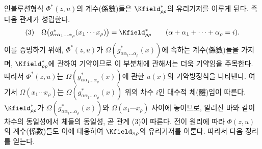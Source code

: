 
인볼루션형식 $\Phi^*(z,u)$의 계수(係數)들은 $\Kfield^*_{\rho\rho}$의 유리기저를 이루게 된다. 즉 다음 관계가 성립한다.
\[
\begin{array}{@{}l@{\quad}c@{}}
(3)& \Omega\bigl(g^*_{\alpha\alpha_1\ldots\alpha_\rho}(x_1\cdots x_\rho)\bigr)=\Kfield^*_{\rho\rho}\qquad(\alpha+\alpha_1+\cdots+\alpha_\rho=i).
\end{array}
\]
이를 증명하기 위해, $\Phi^*(z,u)$가 $\Omega(g^*_{\alpha\alpha_1\ldots\alpha_\rho}(x))$에 속하는 계수(係數)들을 가지며, $\Kfield^*_{\rho\rho}$에 관하여 기약이므로 이 부분체에 관해서는 더욱 기약임을 주목한다. 따라서 $\Phi^*(z,u)$는 $\Omega(g^*_{\alpha\alpha_1\ldots\alpha_\rho}(x))$에 관한 $u(x)$의 기약방정식을 나타낸다. 여기서 $\Omega(x_1\cdots x_\rho)$는 $\Omega(g^*_{\alpha\alpha_1\ldots\alpha_\rho}(x))$ 위의 차수 $i$인 대수적 체(體)임이 따른다. $\Kfield^*_{\rho\rho}$가 $\Omega(g^*_{\alpha\alpha_1\ldots\alpha_\rho}(x))$와 $\Omega(x_1\cdots x_\rho)$ 사이에 놓이므로, 알려진 바와 같이 차수의 동일성에서 체들의 동일성, 곧 관계 (3)이 따른다. 전이 원리에 따라 $\Phi(z,u)$의 계수(係數)들도 이에 대응하여 $\Kfield_{n\rho}$의 유리기저를 이룬다. 따라서 다음 정리를 얻는다.
